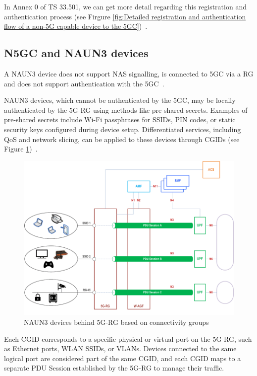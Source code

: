 In Annex 0 of TS 33.501, we can get more detail regarding this registration and authentication process (see Firgure \ref{fig:Detailed registration and authentication flow of a non-5G capable device to the 5GC})~\cite{33.501-p279}.

\subsection{\ac{N5GC} and \acs{NAUN3} devices}

A \acf{NAUN3} device does not support \ac{NAS} signalling, is connected to \ac{5GC} via a \ac{RG} and does not support authentication with the \ac{5GC}~\cite{23.316-p10}.

\ac{NAUN3} devices, which cannot be authenticated by the \ac{5GC}, may be locally authenticated by the \ac{5G-RG} using methods like pre-shared secrets. Examples of pre-shared secrets include Wi-Fi passphrases for \acp{SSID}, \ac{PIN} codes, or static security keys configured during device setup. Differentiated services, including \ac{QoS} and network slicing, can be applied to these devices through \acp{CGID} (see Figure \ref{fig:NAUN3 devices behind 5G-RG based on connectivity groups})~\cite{23.316-p27}.

\begin{figure}
    \centering
    \includegraphics[width=0.75\linewidth]{figs/NAUN3 devices behind 5G-RG based on connectivity groups.png}
    \caption{NAUN3 devices behind \ac{5G-RG} based on connectivity groups}
    \label{fig:NAUN3 devices behind 5G-RG based on connectivity groups}
\end{figure}

Each \ac{CGID} corresponds to a specific physical or virtual port on the \ac{5G-RG}, such as Ethernet ports, \ac{WLAN} \acp{SSID}, or \acp{VLAN}. Devices connected to the same logical port are considered part of the same \ac{CGID}, and each \ac{CGID} maps to a separate \ac{PDU} Session established by the \ac{5G-RG} to manage their traffic.

